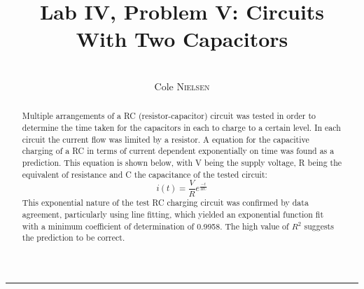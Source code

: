 \documentclass[12pt,letterpaper]{article}
\begin{document}
\title{Lab IV, Problem V: Circuits \\With Two Capacitors}
\author{\\\vspace{12pt}Cole \textsc{Nielsen}}
\date{}

\maketitle
\vspace{-12pt}\hrule
\begin{abstract}
\hspace{-16.5pt}Multiple arrangements of a RC (resistor-capacitor) circuit was tested in order to determine the time taken for the capacitors in each to charge to a certain level. In each circuit the current flow was limited by a resistor. A equation for the capacitive charging of a RC in terms of current dependent exponentially on time was found as a prediction. This equation is shown below, with V being the supply voltage, R being the equivalent of resistance and C the capacitance of the tested circuit: \\
\begin{equation}
i(t)= \frac{V}{R}e^{\frac{-t}{RC}}
\end{equation}
This exponential nature of the test RC charging circuit was confirmed by data agreement, particularly using line fitting, which yielded an exponential function fit with a minimum coefficient of determination of 0.9958. The high value of $R^2$ suggests the prediction to be correct.
\end{abstract}

\hrulefill
\end{document}
